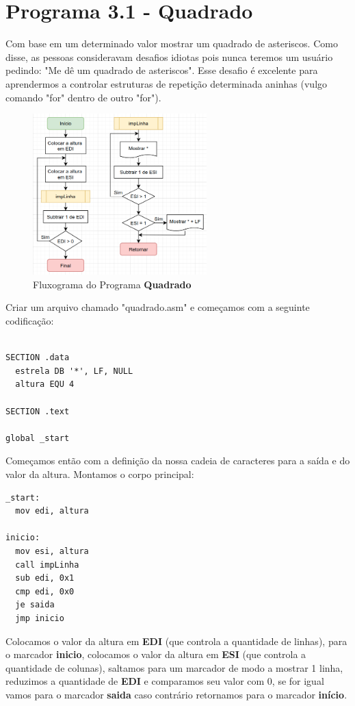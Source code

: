 \section{Programa 3.1 - Quadrado}
Com base em um determinado valor mostrar um quadrado de asteriscos. Como disse, as pessoas consideravam desafios idiotas pois nunca teremos um usuário pedindo: "Me dê um quadrado de asteriscos". Esse desafio é excelente para aprendermos a controlar estruturas de repetição determinada aninhas (vulgo comando "for" dentro de outro "for"). 
\begin{figure}[H]
	\centering
	\includegraphics[width=0.6\textwidth]{Pictures/cap03/programa31}
	\caption{Fluxograma do Programa \textbf{Quadrado}}
\end{figure}

Criar um arquivo chamado "quadrado.asm" e começamos com a seguinte codificação:
\begin{lstlisting}[]
%include 'bibliotecaE.inc'

SECTION .data
  estrela DB '*', LF, NULL
  altura EQU 4

SECTION .text

global _start
\end{lstlisting}

Começamos então com a definição da nossa cadeia de caracteres para a saída e do valor da altura. Montamos o corpo principal:
\begin{lstlisting}[]
_start:
  mov edi, altura

inicio:
  mov esi, altura
  call impLinha
  sub edi, 0x1
  cmp edi, 0x0
  je saida
  jmp inicio	
\end{lstlisting}

Colocamos o valor da altura em \textbf{EDI} (que controla a quantidade de linhas), para o marcador \textbf{inicio}, colocamos o valor da altura em \textbf{ESI} (que controla a quantidade de colunas), saltamos para um marcador de modo a mostrar 1 linha, reduzimos a quantidade de \textbf{EDI} e comparamos seu valor com 0, se for igual vamos para o marcador \textbf{saida} caso contrário retornamos para o marcador \textbf{início}.

